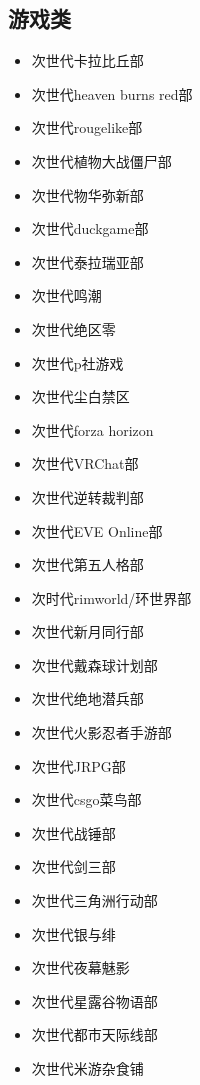 \documentclass[twoside,12pt]{book}
\newenvironment{categorysection}[1]{
  \subsection*{\textcolor{truepurple}{#1}}
  \begin{itemize}[leftmargin=*, 
                 nosep,               %
                 itemsep=2pt,         %
                 parsep=0pt,          %
                 before=\setlength{\baselineskip}{23pt} %
  ]
}{
  \end{itemize}
}
\begin{document}
\begin{multicols}{3}
\begin{categorysection}{游戏类}
        \item 次世代卡拉比丘部
        \item 次世代heaven burns red部
        \item 次世代rougelike部
        \item 次世代植物大战僵尸部
        \item 次世代物华弥新部
        \item 次世代duckgame部
        \item 次世代泰拉瑞亚部
        \item 次世代鸣潮
        \item 次世代绝区零
        \item 次世代p社游戏
        \item 次世代尘白禁区
        \item 次世代forza horizon
        \item 次世代VRChat部
        \item 次世代逆转裁判部
        \item 次世代EVE Online部
        \item 次世代第五人格部
        \item 次时代rimworld/环世界部
        \item 次世代新月同行部
        \item 次世代戴森球计划部
        \item 次世代绝地潜兵部
        \item 次世代火影忍者手游部
        \item 次世代JRPG部
        \item 次世代csgo菜鸟部
        \item 次世代战锤部
        \item 次世代剑三部
        \item 次世代三角洲行动部
        \item 次世代银与绯
        \item 次世代夜幕魅影
        \item 次世代星露谷物语部
        \item 次世代都市天际线部
        \item 次世代米游杂食铺
    \end{categorysection}


\end{multicols}
\end{document}

